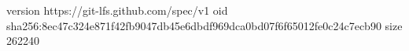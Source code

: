 version https://git-lfs.github.com/spec/v1
oid sha256:8ec47c324e871f42fb9047db45e6dbdf969dca0bd07f6f65012fe0c24c7ecb90
size 262240
